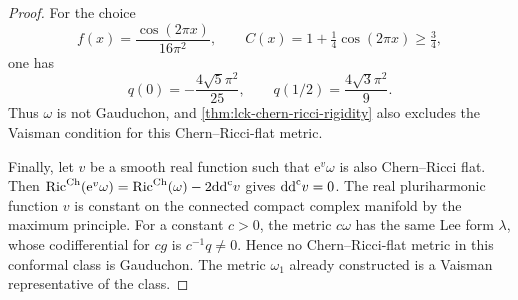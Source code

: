 \begin{proof}
For the choice
\[
 f(x)=\frac{\cos(2\pi x)}{16\pi^2},\qquad
 C(x)=1+\tfrac14\cos(2\pi x)\geq\tfrac34,
\]
one has
\[
 q(0)=-\frac{4\sqrt5\pi^2}{25},\qquad
 q(1/2)=\frac{4\sqrt3\pi^2}{9}.
\]
Thus $\omega$ is not Gauduchon, and \cref{thm:lck-chern-ricci-rigidity} also excludes the Vaisman condition for this Chern--Ricci-flat metric.

Finally, let $v$ be a smooth real function such that $\mathrm e^v\omega$ is also Chern--Ricci flat. Then $\operatorname{Ric}^{\mathrm{Ch}}(\mathrm e^v\omega)=\operatorname{Ric}^{\mathrm{Ch}}(\omega)-2\mathrm{dd}^{\mathrm{c}} v$ gives $\mathrm{dd}^{\mathrm{c}} v=0$. The real pluriharmonic function $v$ is constant on the connected compact complex manifold by the maximum principle. For a constant $c>0$, the metric $c\omega$ has the same Lee form $\lambda$, whose codifferential for $cg$ is $c^{-1}q\neq0$. Hence no Chern--Ricci-flat metric in this conformal class is Gauduchon. The metric $\omega_1$ already constructed is a Vaisman representative of the class.
\end{proof}
